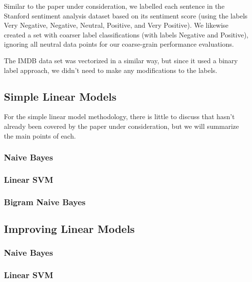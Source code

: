 \documentclass[conference]{IEEEtran}
\begin{document}
Similar to the paper under consideration, we labelled each sentence in the Stanford sentiment analysis dataset based on its sentiment score (using the labels Very Negative, Negative, Neutral, Positive, and Very Positive). We likewise created a set with coarser label classifications (with labels Negative and Positive), ignoring all neutral data points for our coarse-grain performance evaluations.

The IMDB data set was vectorized in a similar way, but since it used a binary label approach, we didn't need to make any modifications to the labels.

\subsection{Simple Linear Models}

For the simple linear model methodology, there is little to discuss that hasn't already been covered by the paper under consideration, but we will summarize the main points of each. 

\subsubsection{Naive Bayes}


\subsubsection{Linear SVM}


\subsubsection{Bigram Naive Bayes}


\subsection{Improving Linear Models}


\subsubsection{Naive Bayes}


\subsubsection{Linear SVM}
\end{document}
